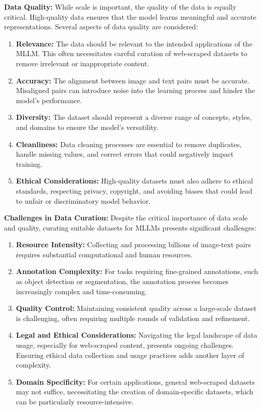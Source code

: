 \textbf{Data Quality:} While scale is important, the quality of the data is equally critical. High-quality data ensures that the model learns meaningful and accurate representations. Several aspects of data quality are considered:
\begin{enumerate}
    \item \textbf{Relevance:} The data should be relevant to the intended applications of the MLLM. This often necessitates careful curation of web-scraped datasets to remove irrelevant or inappropriate content.
    \item \textbf{Accuracy:} The alignment between image and text pairs must be accurate. Misaligned pairs can introduce noise into the learning process and hinder the model's performance.
    \item \textbf{Diversity:} The dataset should represent a diverse range of concepts, styles, and domains to ensure the model's versatility.
    \item \textbf{Cleanliness:} Data cleaning processes are essential to remove duplicates, handle missing values, and correct errors that could negatively impact training.
    \item \textbf{Ethical Considerations:} High-quality datasets must also adhere to ethical standards, respecting privacy, copyright, and avoiding biases that could lead to unfair or discriminatory model behavior.
\end{enumerate}

\textbf{Challenges in Data Curation:} Despite the critical importance of data scale and quality, curating suitable datasets for MLLMs presents significant challenges:

\begin{enumerate}
    \item \textbf{Resource Intensity:} Collecting and processing billions of image-text pairs requires substantial computational and human resources.
    \item \textbf{Annotation Complexity:} For tasks requiring fine-grained annotations, such as object detection or segmentation, the annotation process becomes increasingly complex and time-consuming.
    \item \textbf{Quality Control:} Maintaining consistent quality across a large-scale dataset is challenging, often requiring multiple rounds of validation and refinement.
    \item \textbf{Legal and Ethical Considerations:} Navigating the legal landscape of data usage, especially for web-scraped content, presents ongoing challenges. Ensuring ethical data collection and usage practices adds another layer of complexity.
    \item \textbf{Domain Specificity:} For certain applications, general web-scraped datasets may not suffice, necessitating the creation of domain-specific datasets, which can be particularly resource-intensive.
\end{enumerate}



